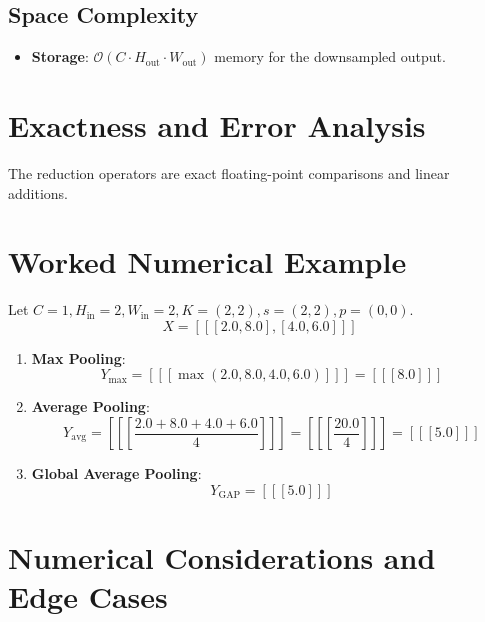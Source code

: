 \documentclass[11pt,a4paper]{article}
\theoremstyle{definition}
\begin{document}
\subsection{Space Complexity}
\begin{itemize}
    \item \textbf{Storage}: $\mathcal{O}(C \cdot H_{\text{out}} \cdot W_{\text{out}})$ memory for the downsampled output.
\end{itemize}

\section{Exactness and Error Analysis}

The reduction operators are exact floating-point comparisons and linear additions.

\section{Worked Numerical Example}

Let $C = 1, H_{\text{in}} = 2, W_{\text{in}} = 2, K = (2, 2), s = (2, 2), p = (0, 0)$.
\begin{equation}
X = [[[2.0, 8.0], [4.0, 6.0]]]
\end{equation}

\begin{enumerate}
    \item \textbf{Max Pooling}:
    \begin{equation}
    Y_{\text{max}} = [[[\max(2.0, 8.0, 4.0, 6.0)]]] = [[[8.0]]]
    \end{equation}
    \item \textbf{Average Pooling}:
    \begin{equation}
    Y_{\text{avg}} = \left[\left[\left[\frac{2.0 + 8.0 + 4.0 + 6.0}{4}\right]\right]\right] = \left[\left[\left[\frac{20.0}{4}\right]\right]\right] = [[[5.0]]]
    \end{equation}
    \item \textbf{Global Average Pooling}:
    \begin{equation}
    Y_{\text{GAP}} = [[[5.0]]]
    \end{equation}
\end{enumerate}

\section{Numerical Considerations and Edge Cases}
\end{document}
